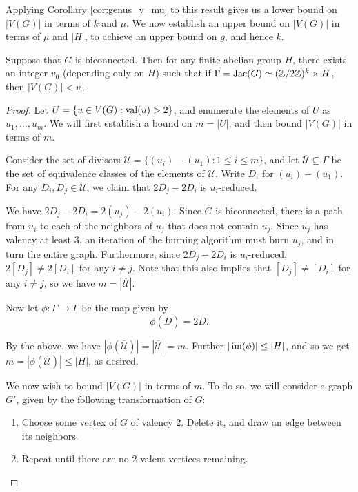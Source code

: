 \documentclass{amsart}
\begin{document}
Applying Corollary \ref{cor:genus_v_mu} to this result gives us a
lower bound on $|V(G)|$ in terms of $k$ and $\mu$. We now establish an
upper bound on $|V(G)|$ in terms of $\mu$ and $|H|$, to achieve an
upper bound on $g$, and hence $k$.

\begin{prop}
  \label{prop:v_bound}
  Suppose that $G$ is biconnected. Then for any finite abelian group $H$, there exists an integer $v_0$
  (depending only on $H$) such that if $\Gamma = \operatorname{Jac}(G) \simeq (\mathbb{Z}/2\mathbb{Z})^k
  \times H$, then $|V(G)| < v_0$.
\end{prop}

\begin{proof}
  Let $U = \{u \in V(G) : \operatorname{val}(u) > 2\}$, and enumerate the elements
  of $U$ as $u_1, \ldots, u_m$. We will first establish a bound on
  $m = |U|$, and then bound $|V(G)|$ in terms of $m$.
  
  Consider the set of divisors $\mathcal{U} = \{(u_i) - (u_1) : 1 \le
  i \le m\}$, and let $\overline{\mathcal{U}} \subseteq \Gamma$ be the set of equivalence
  classes of the elements of $\mathcal{U}$. Write $D_i$ for $(u_i) - (u_1)$. For any $D_i, D_j \in
  \mathcal{U}$, we claim that $2D_j - 2D_i$ is $u_i$-reduced.

  We have $2D_j - 2D_i = 2(u_j) - 2(u_i)$. Since $G$ is biconnected,
  there is a path from $u_i$ to each of the neighbors of $u_j$ that
  does not contain $u_j$. Since $u_j$ has valency at least $3$, an
  iteration of the burning algorithm must burn $u_j$, and in turn the
  entire graph. Furthermore, since $2D_j - 2D_i$ is $u_i$-reduced,
  $2[D_j] \ne 2[D_i]$ for any $i \ne j$. Note that this also implies that
  $[D_j] \ne [D_i]$ for any $i \ne j$, so we have $m=|\overline{\mathcal{U}}|$. 

  Now let $\phi:\Gamma \to \Gamma$ be the map given by
  \[
  \phi(\overline{D}) = 2\overline{D}.
  \] 

  By the above, we have $|\phi(\overline{\mathcal{U}})|=|\overline{\mathcal{U}}|=m$. Further $|\operatorname{im}(\phi)| \le |H|$, and so 
  we get $m=|\phi(\overline{\mathcal{U}})| \le |H|$, as desired.

  We now wish to bound $|V(G)|$ in terms of $m$. To do so, we will
  consider a graph $G'$, given by the following transformation of $G$:

  \begin{enumerate}
  \item Choose some vertex of $G$ of valency $2$. Delete it, and
    draw an edge between its neighbors.
  \item Repeat until there are no 2-valent vertices remaining.
  \end{enumerate}


\end{proof}
\end{document}
